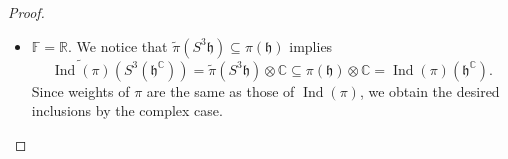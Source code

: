 \documentclass[11pt,reqno]{amsart}
\DeclareMathOperator{\Ind}{Ind}
\DeclareMathOperator{\diag}{diag}
\newcommand{\RR}{\mathbb{R}} %
\newcommand{\CC}{\mathbb{C}} %
\newcommand{\FF}{\mathbb{F}} %
\newcommand{\tp}{{\scriptscriptstyle\mathsf{T}}}
\begin{document}
\begin{proof}
\begin{itemize}
\[\begin{bmatrix}
I_n & C 
\end{bmatrix} = \begin{bmatrix} 
1 & 0 & \cdots & 0 & c_{1,1} & \cdots & c_{1,m-n} \\
0 & 1 & \cdots & 0 & c_{2,1} & \cdots & c_{2,m-n} \\
\vdots & \vdots & \ddots & \vdots & \vdots & \ddots & \vdots \\
0 & 0 & \cdots & 1 & c_{n,1} & \cdots & c_{n,m-n}
\end{bmatrix} \in \mathbb{Q}^{n \times m}.
\]
It is clear that we can construct $B' \in \mathbb{Q}^{n \times \dim (\mathbb{V})}$ from $B$ such that $A' = G B'$.  We take $\omega \coloneqq \omega' G \in \Lambda^n$.  By \eqref{prop: Gauss elimination:eq1} we have $A(H) = \diag ( \omega'(H) A' ) =  \diag ( \omega(H) B' )$ for any $H\in \mathfrak{h}$.  Since $S^3 \left( \pi(\mathfrak{h}) \right) = \widetilde{\pi} \left( S^3 \mathfrak{h}\right)\subseteq \pi(\mathfrak{h})$,  \eqref{lem:rank-orbit:eq2} implies that $A(H)^2 A(H') \in \pi (\mathfrak{h})$ for any $H,H'\in \mathfrak{h}$.  Let $X_1,\dots,  X_n$ be the dual basis of $\omega_1,\dots  \omega_n$.  Then by evaluating $A(X_j)^2 A(X_k)$ we obtain 
\[
c_{js}^3 = c_{js},\quad c_{js}^2 c_{ks} = 0,\quad 1 \le s \le m-n,\; 1 \le j < k \le n.
\]
Therefore,  $c_{js} \in \{0,-1,1\}$ for all $1 \le s \le m-n$ and $1 \le j  \le n$.  Moreover,  for each $1 \le s \le m-n$ there is at most one $1 \le j \le n$ such that $c_{js} \ne 0$.  By \eqref{prop: Gauss elimination:eq1},  we derive that $A = \omega B'$ where $B' \in \{0,\pm 1\}^{n \times \dim (\mathbb{V})}$.  By construction,  we clearly have $\omega = (\lambda_1,\dots,  \lambda_n)^\tp$ and this completes the proof.
\item[$\diamond$] $\FF=\RR$.  We notice that $        \widetilde{\pi} \left( S^3 \mathfrak{h} \right) \subseteq  \pi \left( \mathfrak{h} \right) $ implies 
\[
\widetilde{\Ind(\pi)} \left( S^3 (\mathfrak{h}^{\CC}) \right) = \widetilde{\pi} \left( S^3 \mathfrak{h} \right)\otimes \mathbb{C} \subseteq \pi \left( \mathfrak{h} \right) \otimes \CC = \Ind( \pi)\left( \mathfrak{h}^{\CC}\right).
\]
Since weights of $\pi$ are the same as those of $\Ind(\pi)$,  we obtain the desired inclusions by the complex case.  \qedhere
\end{itemize}
\end{proof}
\end{document}
